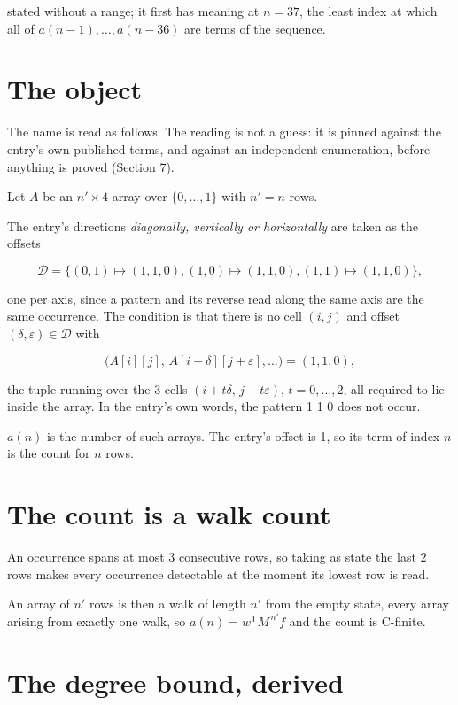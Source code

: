 \documentclass[11pt]{article}
\theoremstyle{definition}
\begin{document}
stated without a range; it first has meaning at $n = 37$, the least index at which all of $a(n-1),\dots,a(n-36)$ are terms of the sequence.

\section{The object}

The name is read as follows. The reading is not a guess: it is pinned against the entry's own published terms, and against an independent enumeration, before anything is proved (Section 7).

Let $A$ be an $n' \times 4$ array over $\{0,\dots,1\}$ with $n' = n$ rows.

The entry's directions {\itshape diagonally, vertically or horizontally} are taken as the offsets

\[\mathcal{D} = \{(0,1)\mapsto(1,1,0), (1,0)\mapsto(1,1,0), (1,1)\mapsto(1,1,0)\},\]

one per axis, since a pattern and its reverse read along the same axis are the same occurrence. The condition is that there is no cell $(i,j)$ and offset $(\delta,\varepsilon)\in\mathcal{D}$ with

\[\bigl(A[i][j],\,A[i{+}\delta][j{+}\varepsilon],\dots\bigr) = (1, 1, 0),\]

the tuple running over the $3$ cells $(i+t\delta,\,j+t\varepsilon)$, $t = 0,\dots,2$, all required to lie inside the array. In the entry's own words, the pattern 1 1 0 does not occur.

$a(n)$ is the number of such arrays. The entry's offset is 1, so its term of index $n$ is the count for $n$ rows.

\section{The count is a walk count}

An occurrence spans at most $3$ consecutive rows, so taking as state the last $2$ rows makes every occurrence detectable at the moment its lowest row is read.

An array of $n'$ rows is then a walk of length $n'$ from the empty state, every array arising from exactly one walk, so $a(n) = w^{\mathsf T}M^{\,n'}f$ and the count is C-finite.

\section{The degree bound, derived}
\end{document}

